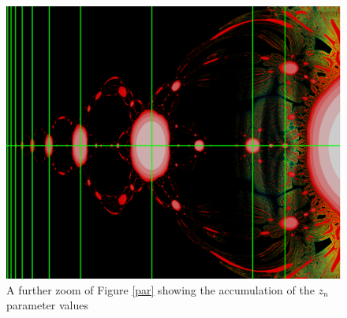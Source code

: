 \begin{figure}[h]
	\centering
	\includegraphics[width=.7\textwidth]{./img/zpar}
	\caption{A further zoom of Figure \ref{par} showing the accumulation of the $z_n$ parameter values}
	\label{zpar}
\end{figure}
\FloatBarrier